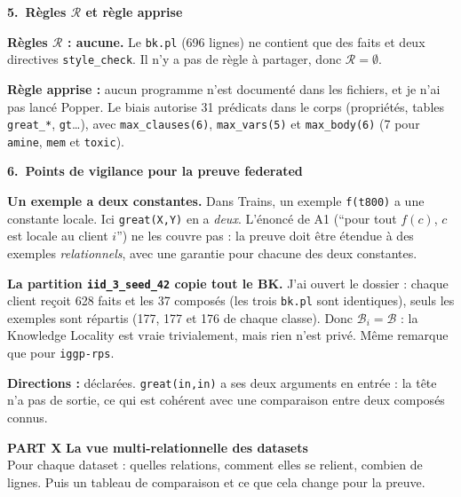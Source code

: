 \documentclass[10pt]{article}
\newcommand{\titrebox}[2]{\needspace{10\baselineskip}\vspace{8pt}
  \begin{tcolorbox}[colback=marine, colframe=marine, arc=0pt, boxrule=0pt,
    top=4pt, bottom=4pt, left=8pt]
  \color{white}\Large\bfseries #1.~#2
  \end{tcolorbox}\vspace{2pt}}
\newcommand{\partie}[3]{\newpage
  \begin{tcolorbox}[colback=pastel, colframe=pastel, arc=0pt, boxrule=0pt,
    top=8pt, bottom=8pt, left=10pt]
  {\fontsize{26}{28}\selectfont\bfseries\textcolor{marine}{PART #1}}\quad
  {\Large\bfseries\textcolor{encre}{#2}}\\[2pt]{\small #3}
  \end{tcolorbox}\vspace{4pt}}
\begin{document}
\titrebox{5}{Règles $\mathcal{R}$ et règle apprise}
\textbf{Règles $\mathcal{R}$ : aucune.} Le \texttt{bk.pl} (696 lignes) ne contient que des faits et deux directives \texttt{style\_check}. Il n'y a pas de règle à partager, donc $\mathcal{R}=\emptyset$.\par\vspace{3pt}
\textbf{Règle apprise :} aucun programme n'est documenté dans les fichiers, et je n'ai pas lancé Popper. Le biais autorise 31 prédicats dans le corps (propriétés, tables \texttt{great\_*}, \texttt{gt}\ldots), avec \texttt{max\_clauses(6)}, \texttt{max\_vars(5)} et \texttt{max\_body(6)} (7 pour \texttt{amine}, \texttt{mem} et \texttt{toxic}).

\titrebox{6}{Points de vigilance pour la preuve federated}
\begin{piege}
\textbf{Un exemple a deux constantes.} Dans Trains, un exemple \texttt{f(t800)} a une constante locale. Ici \texttt{great(X,Y)} en a \emph{deux}. L'énoncé de A1 (``pour tout $f(c)$, $c$ est locale au client $i$'') ne les couvre pas : la preuve doit être étendue à des exemples \emph{relationnels}, avec une garantie pour chacune des deux constantes.
\end{piege}
\begin{piege}
\textbf{La partition \texttt{iid\_3\_seed\_42} copie tout le BK.} J'ai ouvert le dossier : chaque client reçoit 628 faits et les 37 composés (les trois \texttt{bk.pl} sont identiques), seuls les exemples sont répartis (177, 177 et 176 de chaque classe). Donc $\mathcal{B}_i=\mathcal{B}$ : la Knowledge Locality est vraie trivialement, mais rien n'est privé. Même remarque que pour \texttt{iggp-rps}.
\end{piege}
\textbf{Directions :} déclarées. \texttt{great(in,in)} a ses deux arguments en entrée : la tête n'a pas de sortie, ce qui est cohérent avec une comparaison entre deux composés connus.

\partie{X}{La vue multi-relationnelle des datasets}{Pour chaque dataset : quelles relations, comment elles se relient, combien de lignes. Puis un tableau de comparaison et ce que cela change pour la preuve.}
\end{document}
